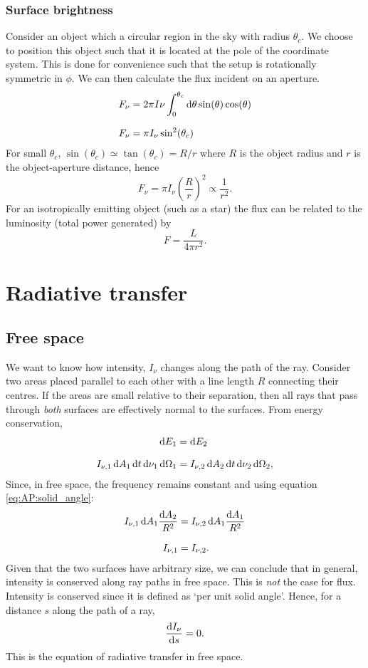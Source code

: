 \subsubsection{Surface brightness}
Consider an object which a circular region in the sky with radius $\theta_c$.
 We choose to position this object such that it is located at the pole of the coordinate system.
 This is done for convenience such that the setup is rotationally symmetric in $\phi$.
 We can then calculate the flux incident on an aperture.
%
\begin{align*}
	F_\nu &= 2\pi I\nu \int_{0}^{\theta_c}\diff\theta \sin(\theta) \cos(\theta)
	\linedrop
	F_\nu &= \pi I_\nu \sin^2(\theta_c)
\end{align*}
%
For small $\theta_c$, $\sin(\theta_c) \simeq \tan(\theta_c) = R/r$ where $R$ is the object radius and $r$ is the object-aperture distance, hence
%
\begin{equation}
	F_\nu = \pi I_\nu  \left( \frac{R}{r} \right) ^2 \propto \frac{1}{r^2}.
	\label{eq:AP:flux_intensity_relation}
\end{equation}
%
For an isotropically emitting object (such as a star) the flux can be related to the luminosity (total power generated) by
%
$$ F = \frac{L}{4\pi r^2}. $$
%
%
%
\section{Radiative transfer}
\subsection{Free space}
We want to know how intensity, $I_\nu$ changes along the path of the ray.
 Consider two areas placed parallel to each other with a line length $R$ connecting their centres.
 If the areas are small relative to their separation, then all rays that pass through \emph{both} surfaces are effectively normal to the surfaces.
 From energy conservation,
\begin{align*}
	\diff E_1 &= \diff E_2
	\linedrop
	I_{\nu ,1}\diff A_1 \diff t \diff \nu_1 \diff \Omega_1 &= I_{\nu ,2}\diff A_2 \diff t \diff \nu_2 \diff \Omega_2 ,	
\end{align*}
%
Since, in free space, the frequency remains constant and using equation \ref{eq:AP:solid_angle}:
%
\begin{align*}
		I_{\nu ,1}\diff A_1 \frac{\diff A_2}{R^2} &= I_{\nu ,2}\diff A_1 \frac{\diff A_1}{R^2}
		\linedrop
		I_{\nu ,1} &= I_{\nu ,2}.
\end{align*}
%
Given that the two surfaces have arbitrary size, we can conclude that in general, intensity is conserved along ray paths in free space.
 This is \emph{not} the case for flux.
 Intensity is conserved since it is defined as `per unit solid angle'.
 Hence, for a distance $s$ along the path of a ray,
%
$$ \frac{\mathop{}\!\mathrm{d} I_\nu}{\mathop{}\!\mathrm{d} s} = 0. $$
%
This is the equation of radiative transfer in free space.
%
%
